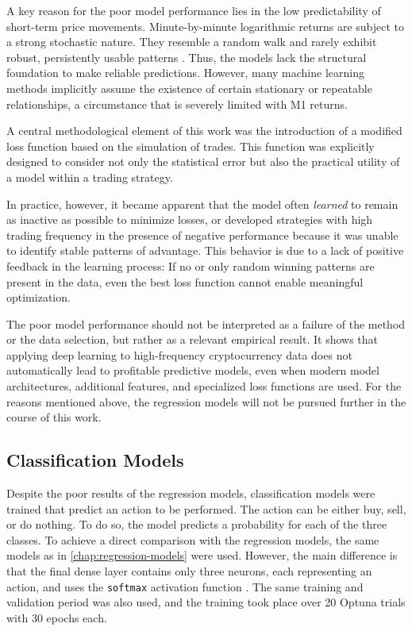 A key reason for the poor model performance lies in the low predictability of short-term price movements.
Minute-by-minute logarithmic returns are subject to a strong stochastic nature.
They resemble a random walk and rarely exhibit robust, persistently usable patterns \cite{random-walk}.
Thus, the models lack the structural foundation to make reliable predictions.
However, many machine learning methods implicitly assume the existence of certain stationary or repeatable relationships, a circumstance that is severely limited with M1 returns.

A central methodological element of this work was the introduction of a modified loss function based on the simulation of trades.
This function was explicitly designed to consider not only the statistical error but also the practical utility of a model within a trading strategy.

In practice, however, it became apparent that the model often \textit{learned} to remain as inactive as possible to minimize losses, or developed strategies with high trading frequency in the presence of negative performance because it was unable to identify stable patterns of advantage.
This behavior is due to a lack of positive feedback in the learning process: If no or only random winning patterns are present in the data, even the best loss function cannot enable meaningful optimization.

The poor model performance should not be interpreted as a failure of the method or the data selection, but rather as a relevant empirical result.
It shows that applying deep learning to high-frequency cryptocurrency data does not automatically lead to profitable predictive models, even when modern model architectures, additional features, and specialized loss functions are used.
For the reasons mentioned above, the regression models will not be pursued further in the course of this work.

\subsection{Classification Models}
\label{chap:classification-models}

Despite the poor results of the regression models, classification models were trained that predict an action to be performed.
The action can be either buy, sell, or do nothing.
To do so, the model predicts a probability for each of the three classes.
To achieve a direct comparison with the regression models, the same models as in \autoref{chap:regression-models} were used.
However, the main difference is that the final dense layer contains only three neurons, each representing an action, and uses the \texttt{softmax} activation function \cite{linear-softmax}.
The same training and validation period was also used, and the training took place over 20 Optuna trials with 30 epochs each.

